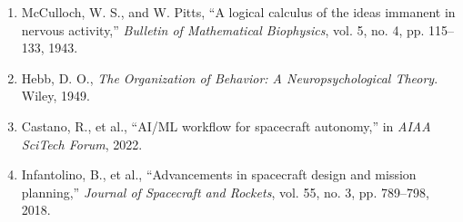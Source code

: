 \documentclass[a4paper,12pt]{article}
\begin{document}
\begin{enumerate}
    \item McCulloch, W. S., and W. Pitts, “A logical calculus of the ideas immanent in nervous activity,” \textit{Bulletin of Mathematical Biophysics}, vol. 5, no. 4, pp. 115–133, 1943.
    
    \item Hebb, D. O., \textit{The Organization of Behavior: A Neuropsychological Theory}. Wiley, 1949.
    
    \item Castano, R., et al., “AI/ML workflow for spacecraft autonomy,” in \textit{AIAA SciTech Forum}, 2022.
    
    \item Infantolino, B., et al., “Advancements in spacecraft design and mission planning,” \textit{Journal of Spacecraft and Rockets}, vol. 55, no. 3, pp. 789–798, 2018.
\end{enumerate}
\end{document}
